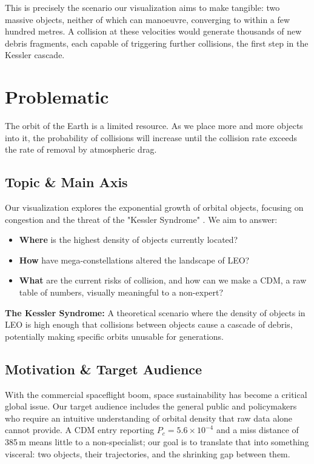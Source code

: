 This is precisely the scenario our visualization aims to make tangible: two massive objects, neither of which can manoeuvre, converging to within a few hundred metres. A collision at these velocities would generate thousands of new debris fragments, each capable of triggering further collisions, the first step in the Kessler cascade.


\section{Problematic}

\begin{fquote}
    The orbit of the Earth is a limited resource. As we place more and more objects into it, the probability of collisions will increase until the collision rate exceeds the rate of removal by atmospheric drag.
\end{fquote}

\subsection{Topic \& Main Axis}
Our visualization explores the exponential growth of orbital objects, focusing on congestion and the threat of the "Kessler Syndrome" \cite{kessler-syndrome}. We aim to answer:
\begin{itemize}
    \item \textbf{Where} is the highest density of objects currently located?
    \item \textbf{How} have mega-constellations altered the landscape of LEO?
    \item \textbf{What} are the current risks of collision, and how can we make a CDM, a raw table of numbers, visually meaningful to a non-expert?
\end{itemize}

\begin{invsummary}
    \textbf{The Kessler Syndrome:} A theoretical scenario where the density of objects in LEO is high enough that collisions between objects cause a cascade of debris, potentially making specific orbits unusable for generations.
\end{invsummary}

\subsection{Motivation \& Target Audience}
With the commercial spaceflight boom, space sustainability has become a critical global issue. Our target audience includes the general public and policymakers who require an intuitive understanding of orbital density that raw data alone cannot provide. A CDM entry reporting $P_c = 5.6\times10^{-4}$ and a miss distance of 385\,m means little to a non-specialist; our goal is to translate that into something visceral: two objects, their trajectories, and the shrinking gap between them.

